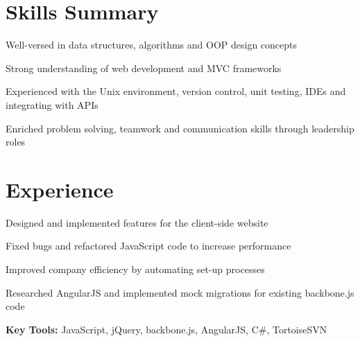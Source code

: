 \documentclass[letterpaper]{deedy-resume} %
\begin{document}
\begin{minipage}[t]{0.66\textwidth} %



\section{Skills Summary}
\vspace{\topsep} %
{\fontsize{11}{13}\selectfont
\begin{tightitemize}
\item Well-versed in data structures, algorithms  and OOP design concepts
\item Strong understanding of web development and MVC frameworks
\item Experienced with the Unix environment, version control, unit testing, IDEs and integrating with APIs
\item Enriched problem solving, teamwork and communication skills through leadership roles 
\end{tightitemize}
}
\sectionspace %


\section{Experience}


{\fontsize{11}{13}\selectfont
\begin{tightitemize}
\item Designed and implemented features for the client-side website
\item Fixed bugs and refactored JavaScript code to increase performance
\item Improved company efficiency by automating set-up processes
\item Researched AngularJS and implemented mock migrations for existing backbone.js code
\end{tightitemize}

\textbf{Key Tools:} JavaScript, jQuery, backbone.js, AngularJS, C\#, TortoiseSVN}
\sectionspace %


\end{minipage}
\end{document}
